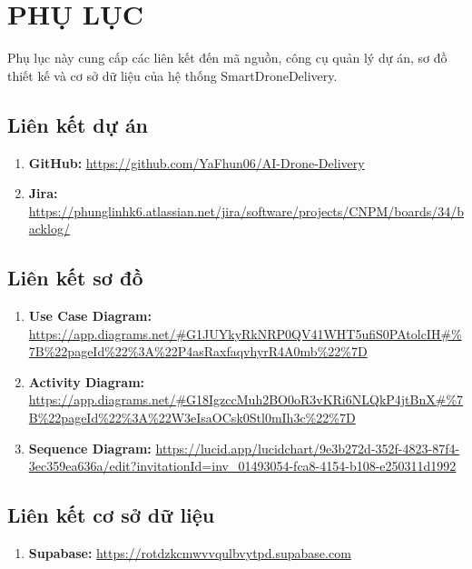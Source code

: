 \chapter{PHỤ LỤC}

Phụ lục này cung cấp các liên kết đến mã nguồn, công cụ quản lý dự án, sơ đồ thiết kế và cơ sở dữ liệu của hệ thống SmartDroneDelivery.

\section{Liên kết dự án}

\begin{enumerate}
    \item \textbf{GitHub:} \url{https://github.com/YaFhun06/AI-Drone-Delivery}
    \item \textbf{Jira:} \url{https://phunglinhk6.atlassian.net/jira/software/projects/CNPM/boards/34/backlog/}
\end{enumerate}

\section{Liên kết sơ đồ}

\begin{enumerate}
    \item \textbf{Use Case Diagram:} \url{https://app.diagrams.net/#G1JUYkyRkNRP0QV41WHT5ufiS0PAtolcIH#%7B%22pageId%22%3A%22P4asRaxfaqvhyrR4A0mb%22%7D}
    \item \textbf{Activity Diagram:} \url{https://app.diagrams.net/#G18IgzccMuh2BO0oR3vKRi6NLQkP4jtBnX#%7B%22pageId%22%3A%22W3eIsaOCsk0Stl0mIh3c%22%7D}
    \item \textbf{Sequence Diagram:} \url{https://lucid.app/lucidchart/9e3b272d-352f-4823-87f4-3ec359ea636a/edit?invitationId=inv_01493054-fca8-4154-b108-e250311d1992}
\end{enumerate}

\section{Liên kết cơ sở dữ liệu}

\begin{enumerate}
    \item \textbf{Supabase:} \url{https://rotdzkcmwvvqulbvytpd.supabase.com}
\end{enumerate}

